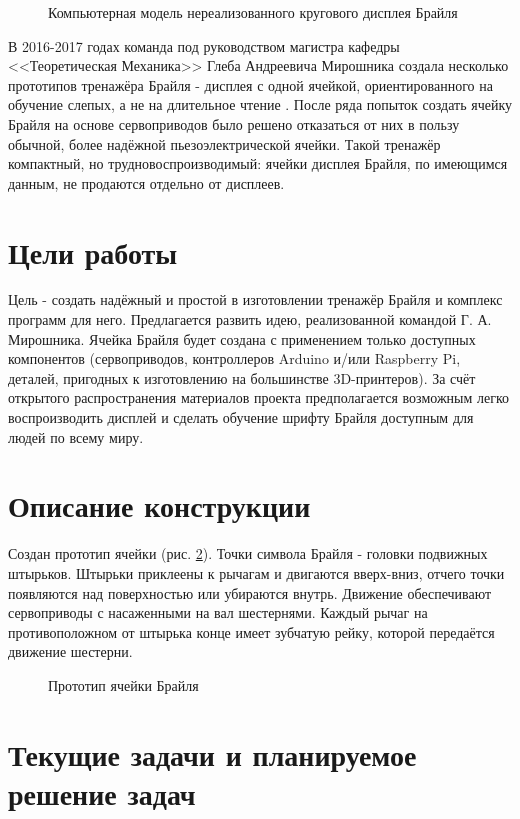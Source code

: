 \documentclass[a4paper,12pt]{article} %
\begin{document}
\begin{figure}[h!]
\caption{Компьютерная модель нереализованного кругового дисплея Брайля}
\label{myRoundDisp}
\end{figure}

В 2016-2017 годах команда под руководством магистра кафедры <<Теоретическая Механика>> Глеба Андреевича Мирошника создала несколько прототипов тренажёра Брайля - дисплея с одной ячейкой, ориентированного на обучение слепых, а не на длительное чтение \cite{gleb}. После ряда попыток создать ячейку Брайля на основе сервоприводов было решено отказаться от них в пользу обычной, более надёжной пьезоэлектрической ячейки. Такой тренажёр компактный, но трудновоспроизводимый: ячейки дисплея Брайля, по имеющимся данным, не продаются отдельно от дисплеев.

\section{Цели работы}
Цель - создать надёжный и простой в изготовлении тренажёр Брайля и комплекс программ для него. Предлагается развить идею, реализованной командой Г. А. Мирошника. Ячейка Брайля будет создана с применением только доступных компонентов (сервоприводов, контроллеров Arduino и/или Raspberry Pi, деталей, пригодных к изготовлению на большинстве 3D-принтеров). За счёт открытого распространения материалов проекта предполагается возможным легко воспроизводить дисплей и сделать обучение шрифту Брайля доступным для людей по всему миру.

\section{Описание конструкции}
Создан прототип ячейки (рис. \ref{photo1}). Точки символа Брайля - головки подвижных штырьков. Штырьки приклеены к рычагам и двигаются вверх-вниз, отчего точки появляются над поверхностью или убираются внутрь. Движение обеспечивают сервоприводы с насаженными на вал шестернями. Каждый рычаг на противоположном от штырька конце имеет зубчатую рейку, которой передаётся движение шестерни.

\begin{figure}[h!]
\caption{Прототип ячейки Брайля}
\label{photo1}
\end{figure}

\section{Текущие задачи и планируемое решение задач}
\end{document}
